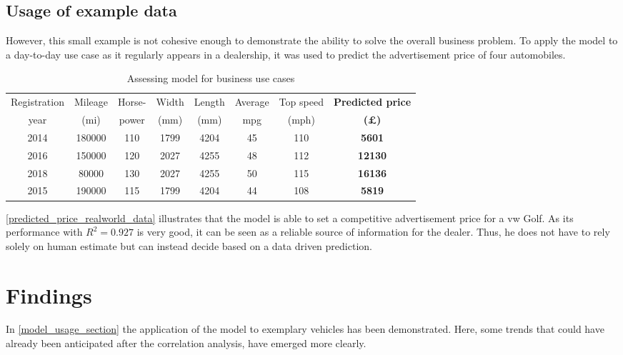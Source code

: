\subsection{Usage of example data}
However, this small example is not cohesive enough to demonstrate the ability to solve the overall business problem.
To apply the model to a day-to-day use case as it regularly appears in a dealership,
it was used to predict the advertisement price of four automobiles.
\begin{table}[H]
    \begin{adjustbox}{width={\textwidth}}
        \begin{tabular}{|c|c|c|c|c|c|c|c|}
            \hline
            Registration & Mileage & Horse- & Width & Length & Average & Top speed & \textbf{Predicted price} \\[-1ex]
            year         & (mi)    & power  & (mm)  & (mm)   & mpg     & (mph)     & \textbf{(£)}             \\ \hline
            2014         & 180000  & 110    & 1799  & 4204   & 45      & 110       & \textbf{5601}            \\\hline
            2016         & 150000  & 120    & 2027  & 4255   & 48      & 112       & \textbf{12130}           \\\hline
            2018         & 80000   & 130    & 2027  & 4255   & 50      & 115       & \textbf{16136}           \\\hline
            2015         & 190000  & 115    & 1799  & 4204   & 44      & 108       & \textbf{5819}            \\ \hline
        \end{tabular}
    \end{adjustbox}
    \caption{Assessing model for business use cases}
    \label{predicted_price_realworld_data}
\end{table}
\autoref{predicted_price_realworld_data} illustrates that the model is able to set a competitive advertisement price
for a \ac{vw} Golf. As its performance with $R^2 = 0.927$ is very good, it can be seen as a reliable source of information for the dealer.
Thus, he does not have to rely solely on human estimate but can instead decide based on a data driven prediction.
\section{Findings}
In \autoref{model_usage_section} the application of the model to exemplary vehicles has been demonstrated.
Here, some trends that could have already been anticipated after the correlation analysis, have emerged more clearly.
